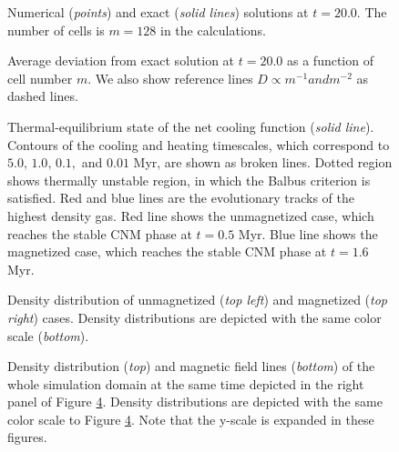 \documentclass[12pt,preprint]{aastex}
\begin{document}
\begin{figure}[t]
\caption{
Numerical (\textit{points}) and exact (\textit{solid lines}) solutions at $t=20.0$.
The number of cells is $m=128$ in the calculations.
}
\label{f2}
\end{figure}


\begin{figure}[t]
\caption{
Average deviation from exact solution at $t=20.0$ as a function of cell number $m$.
We also show reference lines $D\propto m^{-1} and m^{-2}$ as dashed lines.
}
\label{f3}
\end{figure}

\begin{figure}[t]
\caption{
Thermal-equilibrium state of the net cooling function (\textit{solid line}).
Contours of the cooling and heating timescales, which correspond to $5.0,\,1.0,\,0.1,$ and $0.01$ Myr, are shown as broken lines.
Dotted region shows thermally unstable region, in which the Balbus criterion is satisfied.
Red and blue lines are the evolutionary tracks of the highest density gas.
Red line shows the unmagnetized case, which reaches the stable CNM phase at $t=0.5$ Myr.
Blue line shows the magnetized case, which reaches the stable CNM phase at $t=1.6$ Myr.
}
\label{f4}
\end{figure}


\begin{figure}[t]
\caption{
Density distribution of unmagnetized (\textit{top left}) and magnetized (\textit{top right}) cases.
Density distributions are depicted with the same color scale (\textit{bottom}).
}
\label{f5}
\end{figure}


\begin{figure}[t]
\caption{
Density distribution (\textit{top}) and magnetic field lines (\textit{bottom}) of the whole simulation domain at the same time depicted in the right panel of Figure \ref{f5}.
Density distributions are depicted with the same color scale to Figure \ref{f5}.
Note that the y-scale is expanded in these figures.
}
\label{f6}
\end{figure}
\end{document}
